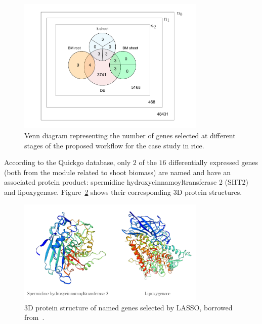 \documentclass{bmcart}
\begin{document}
\begin{figure}[htbp]
  \centering
    \includegraphics[clip,width=0.8\textwidth]{figures/figure6.pdf}
   \caption[Venn diagram for the case study in rice]%
   {Venn diagram representing the number of genes selected at
    different stages of the proposed workflow for the case study in
    rice.}
  \label{fig:final_genes}
\end{figure}

According to the Quickgo database, only $2$ of the $16$ differentially
expressed genes (both from the module related to shoot biomass) are
named and have an associated protein product: spermidine
hydroxycinnamoyltransferase 2 (SHT2) and lipoxygenase.
Figure~\ref{fig:3d} shows their corresponding 3D protein structures.
\vspace{0.5cm}

\begin{figure}[htbp]
  \centering
    \includegraphics[clip,width=0.8\textwidth]{figures/figure7.pdf}
  \caption{3D protein structure of named genes selected by LASSO, borrowed from~\cite{szklarczyk2016string}.}
  \label{fig:3d}
\end{figure}
\end{document}
